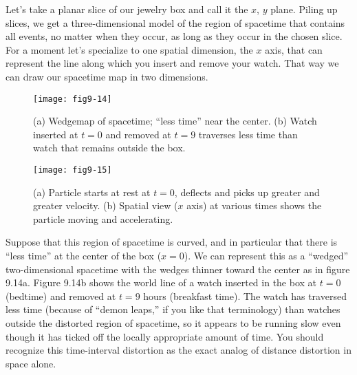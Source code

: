\documentclass{book}
\begin{document}
Let's take a planar slice of our jewelry box and call it the $x$, $y$ plane.
Piling up slices, we get a three-dimensional model of the region of
spacetime that contains all events, no matter when they occur, as long
as they occur in the chosen slice. For a moment let's specialize to one
spatial dimension, the $x$ axis, that can represent the line along which
you insert and remove your watch. That way we can draw our spacetime
map in two dimensions.

\begin{figure}
\begin{center}
\texttt{[image: fig9-14]}
\caption{(a) Wedgemap of spacetime; ``less time'' near the center. (b) Watch inserted at $t = 0$ and removed at $t = 9$ traverses less time than watch that remains outside the box.}
\end{center}
\end{figure}

\begin{figure}
\begin{center}
\texttt{[image: fig9-15]}
\caption{(a) Particle starts at rest at $t = 0$, deflects and picks up greater and greater velocity. (b) Spatial view ($x$ axis) at various times shows the particle moving and accelerating.}
\end{center}
\end{figure}

Suppose that this region of spacetime is curved, and in particular that
there is ``less time'' at the center of the box ($x = 0$). We can represent
this as a ``wedged'' two-dimensional spacetime with the wedges thinner
toward the center as in figure 9.14a. Figure 9.14b shows the world line
of a watch inserted in the box at $t = 0$ (bedtime) and removed at $t =
9$ hours (breakfast time). The watch has traversed less time (because
of ``demon leaps,'' if you like that terminology) than watches outside
the distorted region of spacetime, so it appears to be running slow even
though it has ticked off the locally appropriate amount of time. You
should recognize this time-interval distortion as the exact analog of
distance distortion in space alone.
\end{document}
